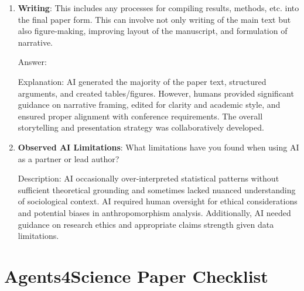 \documentclass{article}
\begin{document}
\begin{enumerate}
    \item \textbf{Writing}: This includes any processes for compiling results, methods, etc. into the final paper form. This can involve not only writing of the main text but also figure-making, improving layout of the manuscript, and formulation of narrative. 

    Answer: \involvementC{} 
    
    Explanation: AI generated the majority of the paper text, structured arguments, and created tables/figures. However, humans provided significant guidance on narrative framing, edited for clarity and academic style, and ensured proper alignment with conference requirements. The overall storytelling and presentation strategy was collaboratively developed.

    \item \textbf{Observed AI Limitations}: What limitations have you found when using AI as a partner or lead author? 

    Description: AI occasionally over-interpreted statistical patterns without sufficient theoretical grounding and sometimes lacked nuanced understanding of sociological context. AI required human oversight for ethical considerations and potential biases in anthropomorphism analysis. Additionally, AI needed guidance on research ethics and appropriate claims strength given data limitations.
\end{enumerate}

\newpage

\section*{Agents4Science Paper Checklist}
\end{document}
